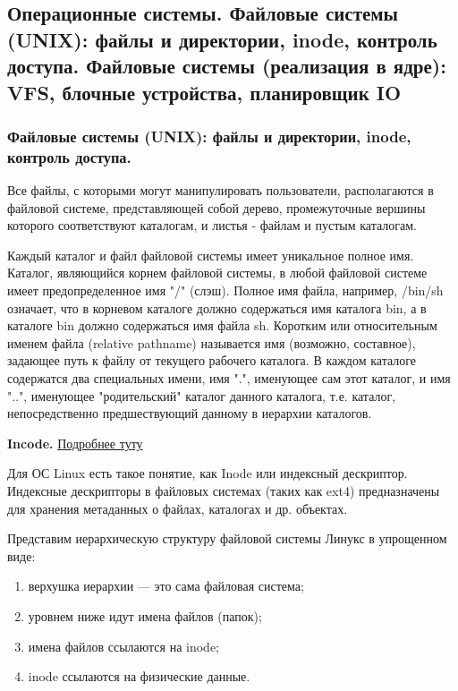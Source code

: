 \subsection{Операционные системы. Файловые системы (UNIX): файлы и директории, inode, контроль доступа. Файловые системы (реализация в ядре): VFS, блочные устройства, планировщик IO}

\subsubsection{Файловые системы (UNIX): файлы и директории, inode, контроль доступа.}

Все файлы, с которыми могут манипулировать пользователи, располагаются в файловой системе, представляющей собой дерево, промежуточные вершины которого соответствуют каталогам, и листья - файлам и пустым каталогам. 

Каждый каталог и файл файловой системы имеет уникальное полное имя. Каталог, являющийся корнем файловой системы, в любой файловой системе имеет предопределенное имя "/" (слэш). Полное имя файла, например, /bin/sh означает, что в корневом каталоге должно содержаться имя каталога bin, а в каталоге bin должно содержаться имя файла sh. 
Коротким или относительным именем файла (relative pathname) называется имя (возможно, составное), задающее путь к файлу от текущего рабочего каталога. 
В каждом каталоге содержатся два специальных имени, имя ".", именующее сам этот каталог, и имя "..", именующее "родительский" каталог данного каталога, т.е. каталог, непосредственно предшествующий данному в иерархии каталогов.

\textbf{Incode.} \href{https://freehost.com.ua/faq/articles/inode-v-linux--chto-eto-takoe/}{Подробнее туту}

Для ОС Linux есть такое понятие, как Inode или индексный дескриптор. Индексные дескрипторы в файловых системах (таких как ext4) предназначены для хранения метаданных о файлах, каталогах и др. объектах.

Представим иерархическую структуру файловой системы Линукс в упрощенном виде:
\begin{enumerate}
	\item верхушка иерархии — это сама файловая система;
	\item уровнем ниже идут имена файлов (папок);
	\item имена файлов ссылаются на inode;
	\item inode ссылаются на физические данные.
\end{enumerate}

